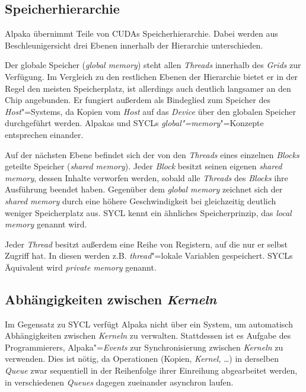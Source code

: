 \subsection{Speicherhierarchie}
\label{alpaka:konzepte:speicher}

Alpaka übernimmt Teile von CUDAs Speicherhierarchie. Dabei werden aus
Beschleunigersicht drei Ebenen innerhalb der Hierarchie unterschieden.

Der globale Speicher (\textit{global memory}) steht allen \textit{Threads}
innerhalb des \textit{Grids} zur Verfügung. Im Vergleich zu den restlichen
Ebenen der Hierarchie bietet er in der Regel den meisten Speicherplatz, ist
allerdings auch deutlich langsamer an den Chip angebunden. Er fungiert außerdem
als Bindeglied zum Speicher des \textit{Host}"=Systems, da Kopien vom
\textit{Host} auf das \textit{Device} über den globalen Speicher durchgeführt
werden. Alpakas und SYCLs \textit{global"=memory}"=Konzepte entsprechen einander.

Auf der nächsten Ebene befindet sich der von den \textit{Threads} eines
einzelnen \textit{Blocks} geteilte Speicher (\textit{shared memory}). Jeder
\textit{Block} besitzt seinen eigenen \textit{shared memory}, dessen Inhalte
verworfen werden, sobald alle \textit{Threads} des \textit{Blocks} ihre
Ausführung beendet haben. Gegenüber dem \textit{global memory} zeichnet sich der
\textit{shared memory} durch eine höhere Geschwindigkeit bei gleichzeitig
deutlich weniger Speicherplatz aus. SYCL kennt ein ähnliches Speicherprinzip,
das \textit{local memory} genannt wird.

Jeder \textit{Thread} besitzt außerdem eine Reihe von Registern, auf die nur er
selbst Zugriff hat. In diesen werden z.B. \textit{thread}"=lokale Variablen
gespeichert. SYCLs Äquivalent wird \textit{private memory} genannt.

\subsection{Abhängigkeiten zwischen \textit{Kerneln}}
\label{alpaka:konzepte:abhaengigkeiten}

Im Gegensatz zu SYCL verfügt Alpaka nicht über ein System, um automatisch
Abhängigkeiten zwischen \textit{Kerneln} zu verwalten. Stattdessen ist es
Aufgabe des Programmierers, Alpaka"=\textit{Events} zur Synchronisierung
zwischen \textit{Kerneln} zu verwenden. Dies ist nötig, da Operationen (Kopien,
\textit{Kernel}, \ldots) in derselben \textit{Queue} zwar sequentiell in der
Reihenfolge ihrer Einreihung abgearbeitet werden, in verschiedenen
\textit{Queues} dagegen zueinander asynchron laufen.

